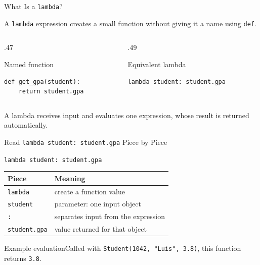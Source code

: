 \documentclass[aspectratio=169,10pt]{beamer}
\begin{document}
\begin{frame}[fragile]{What Is a \texttt{lambda}?}
\small
\begin{cpdefinition}A \texttt{lambda} expression creates a small function without giving it a name using \texttt{def}.\end{cpdefinition}
\begin{columns}[T,onlytextwidth]
\begin{column}{.47\textwidth}
\begin{block}{Named function}
\footnotesize
\begin{verbatim}
def get_gpa(student):
    return student.gpa
\end{verbatim}
\end{block}
\end{column}
\begin{column}{.49\textwidth}
\begin{block}{Equivalent lambda}
\footnotesize
\begin{verbatim}
lambda student: student.gpa
\end{verbatim}
\end{block}
\end{column}
\end{columns}
\begin{keyidea}A lambda receives input and evaluates one expression, whose result is returned automatically.\end{keyidea}
\end{frame}

\begin{frame}{Read \texttt{lambda student: student.gpa} Piece by Piece}
\small
\begin{center}
\texttt{lambda student: student.gpa}\medskip

\begin{tabular}{ll}
\textbf{Piece} & \textbf{Meaning}\\\hline
\texttt{lambda} & create a function value\\[6pt]
\texttt{student} & parameter: one input object\\[6pt]
\texttt{:} & separates input from the expression\\[6pt]
\texttt{student.gpa} & value returned for that object
\end{tabular}
\end{center}
\begin{block}{Example evaluation}Called with \texttt{Student(1042, "Luis", 3.8)}, this function returns \texttt{3.8}.\end{block}
\end{frame}
\end{document}

